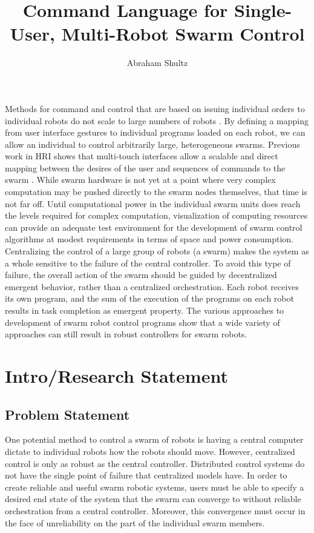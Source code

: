 \documentclass[]{article}
\title{Command Language for Single-User, Multi-Robot Swarm Control}
\author{Abraham Shultz}
\begin{document}
\maketitle

\begin{abstract}

\end{abstract}

Methods for command and control that are based on issuing individual orders to individual robots do not scale to large numbers of robots \cite{WangSearchScale}.
By defining a mapping from user interface gestures to individual programs loaded on each robot, we can allow an individual to control arbitrarily large, heterogeneous swarms.
Previous work in HRI shows that multi-touch interfaces allow a scalable and direct mapping between the desires of the user and sequences of commands to the swarm \cite{micire2009multi}. 
While swarm hardware is not yet at a point where very complex computation may be pushed directly to the swarm nodes themselves, that time is not far off. 
Until computational power in the individual swarm units does reach the levels required for complex computation, visualization of computing resources can provide an adequate test environment for the development of swarm control algorithms at modest requirements in terms of space and power consumption. 
Centralizing the control of a large group of robots (a swarm) makes the system as a whole sensitive to the failure of the central controller. 
To avoid this type of failure, the overall action of the swarm should be guided by decentralized emergent behavior, rather than a centralized orchestration. 
Each robot receives its own program, and the sum of the execution of the programs on each robot results in task completion as emergent property.
The various approaches to development of swarm robot control programs show that a wide variety of approaches can still result in robust controllers for swarm robots. 

\section{Intro/Research Statement}

\subsection{Problem Statement}

One potential method to control a swarm of robots is having a central computer dictate to individual robots how the robots should move.
However, centralized control is only as robust as the central controller. 
Distributed control systems do not have the single point of failure that centralized models have. 
In order to create reliable and useful swarm robotic systems, users must be able to specify a desired end state of the system that the swarm can converge to without reliable orchestration from a central controller. 
Moreover, this convergence must occur in the face of unreliability on the part of the individual swarm members. 
\end{document}
